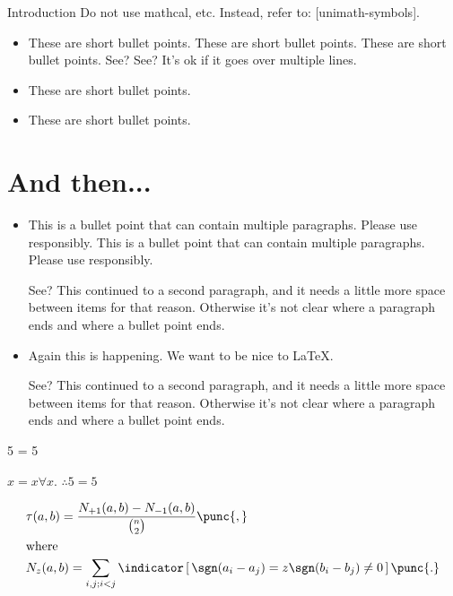 \begin{MainChapter}{Introduction}
Do not use mathcal, etc. Instead, refer to: [unimath-symbols].

\begin{itemize}
    \item These are short bullet points. These are short bullet points. These are short bullet points. See? See? It's ok if it goes over multiple lines.
    \item These are short bullet points.
    \item These are short bullet points.
\end{itemize}

\newpage
\section{And then...}

\begin{itemize}[long]  %
    \item
    This is a bullet point that can contain multiple paragraphs. Please use responsibly.
    This is a bullet point that can contain multiple paragraphs. Please use responsibly.
    
    See? This continued to a second paragraph, and it needs a little more space between items for that reason. Otherwise it's not clear where a paragraph ends and where a bullet point ends.
    
    \item Again this is happening. We want to be nice to LaTeX.
    
    See? This continued to a second paragraph, and it needs a little more space between items for that reason. Otherwise it's not clear where a paragraph ends and where a bullet point ends.
\end{itemize}

\begin{Theorem}[label=mythm, name=Fiveness]
5 = 5
\end{Theorem}

\begin{Proof}  %
$x = x \forall x$. $\therefore 5 = 5$
\end{Proof}


\begin{align}
    & \tau(a, b) = \frac{ N_{+1}(a,b) - N_{-1}(a,b)}{\textstyle \binom{n}{2}}
    \label{eqn:kappa}\punc{,}\\
    \shortintertext{where}
    & N_z(a,b) = \sum_{i,j;i<j}\indicator \left[ \, \sgn(a_i - a_j) = z \sgn(b_i - b_j) \neq 0 \, \right]
    \punc{.}  %
\end{align}


\end{MainChapter}
